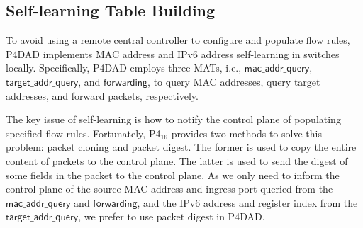 \documentclass[a4paper,fleqn]{cas-dc}
\begin{document}
    \subsection{Self-learning Table Building}\label{sec:self-learning building}
        To avoid using a remote central controller to configure and populate flow rules, P4DAD implements MAC address and IPv6 address self-learning in switches locally. 
        Specifically, P4DAD employs three MATs, i.e., $\mathsf{mac\_addr\_query}$, $\mathsf{target\_addr\_query}$, and $\mathsf{forwarding}$, to query MAC addresses, query target addresses, and forward packets, respectively.

        The key issue of self-learning is how to notify the control plane of populating specified flow rules. Fortunately, P4$_{16}$ provides two methods to solve this problem: packet cloning and packet digest. The former is used to copy the entire content of packets to the control plane. The latter is used to send the digest of some fields in the packet to the control plane.
        As we only need to inform the control plane of the source MAC address and ingress port queried from the $\mathsf{mac\_addr\_query}$ and $\mathsf{forwarding}$, and the IPv6 address and register index from the $\mathsf{target\_addr\_query}$, we prefer to use packet digest in P4DAD.
\end{document}
